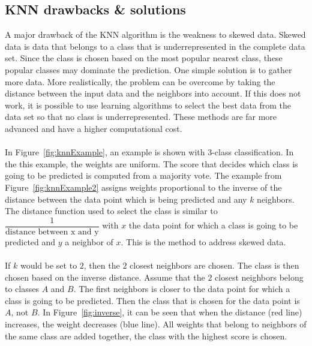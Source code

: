 \subsection{KNN drawbacks \& solutions}
\noindent A major drawback of the KNN algorithm is the weakness to skewed data. Skewed data is data that belongs to a class that is underrepresented in the complete data set. Since the class is chosen based on the most popular nearest class, these popular classes may dominate the prediction. One simple solution is to gather more data. More realistically, the problem can be overcome by taking the distance between the input data and the neighbors into account. If this does not work, it is possible to use learning algorithms to select the best data from the data set so that no class is underrepresented. These methods are far more advanced and have a higher computational cost. \\
\\
In Figure~\ref{fig:knnExample}, an example is shown with 3-class classification. In the this example, the weights are uniform. The score that decides which class is going to be predicted is computed from a majority vote. The example from Figure~\ref{fig:knnExample2} assigns weights proportional to the inverse of the distance between the data point which is being predicted and any $k$ neighbors. The distance function used to select the class is similar to $ \dfrac{1}{\text{distance between x and y}} $ with $x$ the data point for which a class is going to be predicted and $y$ a neighbor of $x$. This is the method to address skewed data. \\
\\
If $k$ would be set to $2$, then the $2$ closest neighbors are chosen. The class is then chosen based on the inverse distance. Assume that the $2$ closest neighbors belong to classes $A$ and $B$. The first neighbors is closer to the data point for which a class is going to be predicted. Then the class that is chosen for the data point is $A$, not $B$. In Figure~\ref{fig:inverse}, it can be seen that when the distance (red line) increases, the weight decreases (blue line). All weights that belong to neighbors of the same class are added together, the class with the highest score is chosen.
